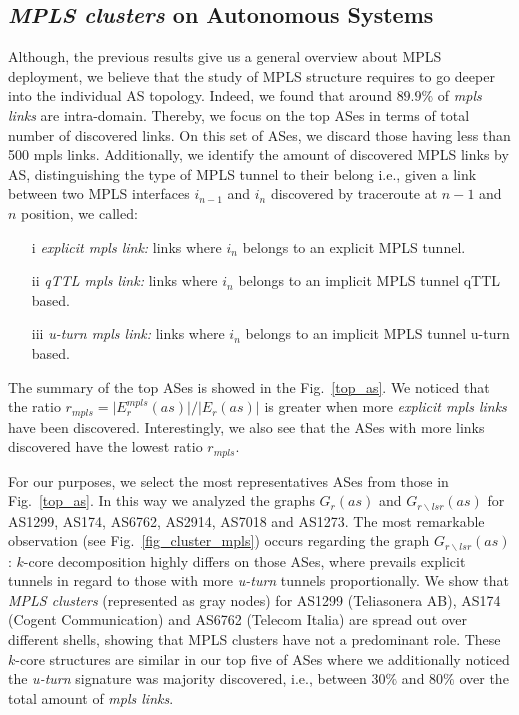 \subsection{\textit{MPLS clusters} on Autonomous Systems}\label{cluster.as}
Although, the previous results give us a general overview about MPLS deployment,
we believe that the study of MPLS structure requires to go deeper into the
individual AS topology. Indeed, we found that around $89.9\%$ of \textit{mpls
links} are intra-domain. Thereby, we focus on the top ASes in terms of total
number of discovered links.  On this set of ASes, we discard those having less
than 500 mpls links. Additionally, we identify the amount of discovered MPLS
links by AS, distinguishing the type of MPLS tunnel to their belong i.e., given
a link between two MPLS interfaces $i_{n-1}$  and $i_{n}$ discovered by 
traceroute at $n-1$ and $n$ position, we called:

\begin{itemize}
  \item[i] \textit{explicit mpls link:} links 
  where $i_{n}$ belongs  to an explicit MPLS tunnel.
  \item[ii] \textit{qTTL mpls link:} links 
  where $i_{n}$ belongs  to an implicit MPLS tunnel qTTL based.
  \item[iii] \textit{u-turn mpls link:} links 
  where $i_{n}$ belongs  to an implicit MPLS tunnel u-turn based.
\end{itemize}

The summary of the top ASes is showed in the Fig.~\ref{top_as}.
We noticed that the ratio $r_{mpls}= \vert E^{mpls}_{r} (as) \vert /\vert E_{r}
(as) \vert $  is greater when more  \textit{explicit mpls links} have been
discovered. Interestingly, we also see that the ASes with more links discovered
have the lowest ratio $r_{mpls}$.

For our purposes, we select the most representatives ASes from those in
Fig.~\ref{top_as}. In this way we analyzed the graphs $G_{r}(as)$ and
$G_{r\backslash lsr}(as)$ for AS1299, AS174, AS6762, AS2914, AS7018 and AS1273.
The most remarkable observation (see Fig.~\ref{fig_cluster_mpls}) occurs
regarding the graph $G_{r\backslash lsr}(as)$: $k$-core decomposition highly
differs on those ASes, where prevails explicit tunnels in regard to those with
more \textit{u-turn} tunnels proportionally. We show that \textit{MPLS clusters}
(represented as gray nodes) for  AS1299 (Teliasonera AB), AS174 (Cogent
Communication) and AS6762 (Telecom Italia) are spread out over different shells, showing that MPLS clusters have not a predominant role.
These $k$-core structures are similar in our top five of ASes where we
additionally noticed  the \textit{u-turn} signature was majority discovered,
i.e., between $30\%$ and  $80\%$ over  the total amount of \textit{mpls links}.


